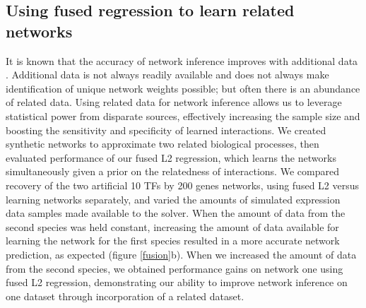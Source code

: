 \documentclass[11pt]{article}
\begin{document}
\subsection{Using fused regression to learn related networks}
It is known that the accuracy of network inference improves with additional data \cite{bar-joseph_computational_2003}. 
Additional data is not always readily available and does not always make identification of unique network weights possible; but often there is an abundance of related data. 
Using related data for network inference allows us to leverage statistical power from disparate sources, effectively increasing the sample size and boosting the sensitivity and specificity of learned interactions. 
We created synthetic networks to approximate two related biological processes, then evaluated performance of our fused L2 regression, which learns the networks simultaneously given a prior on the relatedness of interactions. 
We compared recovery of the two artificial 10 TFs by 200 genes networks, using fused L2 versus learning networks separately, and varied the amounts of simulated expression data samples made available to the solver. 
When the amount of data from the second species was held constant, increasing the amount of data available for learning the network for the first species resulted in a more accurate network prediction, as expected  (figure \ref{fusion}b). 
When we increased the amount of data from the second species, we obtained performance gains on network one using fused L2 regression, demonstrating our ability to improve network inference on one dataset through incorporation of a related dataset.
\end{document}
